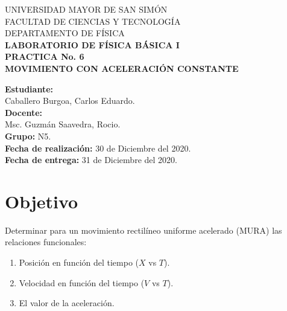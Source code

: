 \documentclass[letter,11pt]{article}
\newcommand{\blankpage}{
\newpage
\thispagestyle{empty}
\mbox{}
\newpage
}
\begin{document}
\begin{titlepage}
\begin{center}
{\Large UNIVERSIDAD MAYOR DE SAN SIMÓN}\\
\vspace*{0.15cm}
{\large FACULTAD DE CIENCIAS Y TECNOLOGÍA}\\
\vspace*{0.10cm}
DEPARTAMENTO DE FÍSICA\\
\vspace*{3.0cm}
{\Large \textbf{LABORATORIO DE FÍSICA BÁSICA I}}\\
\vspace*{0.3cm}
{\Large \textbf{PRACTICA No. 6}}\\
\vspace*{3.5cm}
{\Large \textbf{MOVIMIENTO CON ACELERACIÓN CONSTANTE}}\\
\end{center}

\vspace*{7.4cm}
\leftskip=7.95cm
\noindent
\textbf{Estudiante:}\\
Caballero Burgoa, Carlos Eduardo.\\
\newline
\textbf{Docente:}\\
Msc. Guzmán Saavedra, Rocio.\\
\newline
\textbf{Grupo:} N5.\\
\textbf{Fecha de realización:} 30 de Diciembre del 2020.\\
\textbf{Fecha de entrega:} 31 de Diciembre del 2020.\\

\end{titlepage}

\blankpage

\section{Objetivo}
Determinar para un movimiento rectilíneo uniforme acelerado (MURA) las
relaciones funcionales:

\begin{enumerate}[label=(\alph*)]
    \item Posición en función del tiempo ($X$ vs $T$).
    \item Velocidad en función del tiempo ($V$ vs $T$).
    \item El valor de la aceleración.
\end{enumerate}
\end{document}
